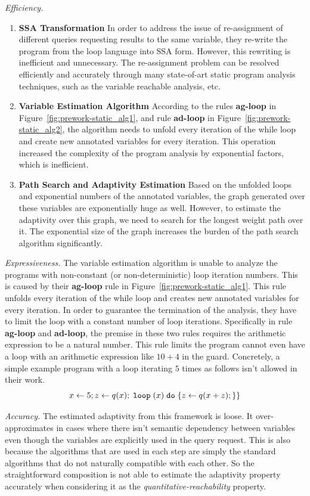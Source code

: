 \emph{Efficiency.}
 \begin{enumerate}
 \item \textbf{SSA Transformation}
 In order to address the issue of re-assignment of different queries requesting results to the same variable, they re-write the program from the loop language into SSA form.
 However, this rewriting is inefficient and unnecessary.
 The re-assignment problem can be resolved efficiently and accurately through many state-of-art static program analysis techniques, such as the
 variable reachable analysis, etc.

 \item \textbf{Variable Estimation Algorithm}
 According to the rules \textbf{ag-loop} in Figure~\ref{fig:prework-static_alg1},
 and rule \textbf{ad-loop} in Figure~\ref{fig:prework-static_alg2}, the algorithm needs to
 unfold every iteration of the while loop and create new annotated variables for every iteration.
 This operation increased the complexity of the program analysis by exponential factors, which is inefficient.

 \item \textbf{Path Search and Adaptivity Estimation}
 Based on the unfolded loops and exponential numbers of the annotated variables, the graph
 generated over these variables are exponentially huge as well.
 However, to estimate the adaptivity over this graph, we need to search for the longest weight path over it.
 The exponential size of the graph increases the burden of the path search algorithm significantly.
 \end{enumerate}
 \emph{Expressiveness.}
 The variable estimation algorithm is unable to analyze the programs with
 non-constant (or non-deterministic) loop iteration numbers.
 This is caused by their \textbf{ag-loop} rule in Figure~\ref{fig:prework-static_alg1}.
 This rule unfolds every iteration of the while loop and creates new annotated variables for every iteration.
 In order to guarantee the termination of the analysis, they have to limit the loop with a constant number of loop iterations.
 Specifically in rule \textbf{ag-loop} and \textbf{ad-loop},
 the premise in these two rules requires
 the arithmetic expression
 to be a natural number. 
 This rule limits the program cannot even
 have a loop with an arithmetic expression like $10 + 4$ in the guard.
 Concretely, a simple example program with a loop iterating $5$ times as follows isn't allowed in their work.
 \[
 {\mathrel{ x \leftarrow 5 }};
 \mathrel{ z \leftarrow q(x) };
 \;\mathtt{loop}\; (x ) \;\mathtt{do}\; 
 \{
 \mathrel{ z \leftarrow q(x + z) };
 \}\}
 \] 

 \emph{Accuracy.}
 The estimated adaptivity from this framework is loose.
 It over-approximates in cases where there isn't semantic dependency between variables even though the variables
 are explicitly used in the query request.
 This is also because the algorithms that are used in each step are simply the standard algorithms that do not naturally
 compatible with each other.
 So the straightforward composition is not able to estimate
 the adaptivity property accurately when considering it as
 the \emph{quantitative-reachability} property.

